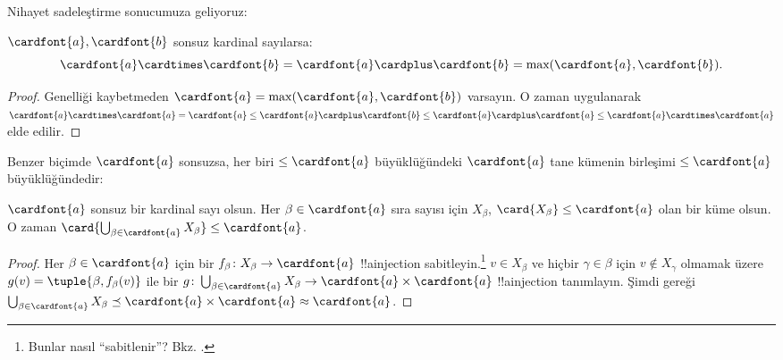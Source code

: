 Nihayet sadeleştirme sonucumuza geliyoruz:

\begin{thm}
$\cardfont{a},\cardfont{b}$ sonsuz kardinal sayılarsa:
\[
	\cardfont{a}
\cardtimes \cardfont{b} = \cardfont{a} \cardplus \cardfont{b} =
\text{max}(\cardfont{a}, \cardfont{b}).
\]
\end{thm}

\begin{proof}
Genelliği kaybetmeden $\cardfont{a}=\max(\cardfont{a},\cardfont{b})$
varsayın. O zaman  uygulanarak
$\cardfont{a}\cardtimes\cardfont{a}=\cardfont{a}\leq\cardfont{a}
\cardplus\cardfont{b}\leq\cardfont{a}\cardplus\cardfont{a}\leq
\cardfont{a}\cardtimes\cardfont{a}$ elde edilir.
\end{proof}\noindent
Benzer biçimde $\cardfont{a}$ sonsuzsa, her biri
$\leq\cardfont{a}$ büyüklüğündeki $\cardfont{a}$ tane kümenin birleşimi
$\leq\cardfont{a}$ büyüklüğündedir:

\begin{prop}
$\cardfont{a}$ sonsuz bir kardinal sayı olsun. Her
$\beta\in\cardfont{a}$ sıra sayısı için $X_\beta$,
$\card{X_\beta}\leq\cardfont{a}$ olan bir küme olsun. O zaman
$\card{\bigcup_{\beta \in \cardfont{a}} X_\beta}\leq\cardfont{a}$.
\end{prop}

\begin{proof}
Her $\beta\in\cardfont{a}$ için bir $f_\beta\colon
X_\beta\to\cardfont{a}$ !!a{injection} sabitleyin.\footnote{Bunlar nasıl
``sabitlenir''? Bkz. .}
$v\in X_\beta$ ve hiçbir $\gamma\in\beta$ için $v\notin X_\gamma$
olmamak üzere $g(v)=\tuple{\beta,f_\beta(v)}$ ile bir
$g\colon\bigcup_{\beta \in \cardfont{a}}X_\beta\to
\cardfont{a}\times\cardfont{a}$ !!a{injection} tanımlayın. Şimdi
 gereği
$\bigcup_{\beta \in \cardfont{a}} X_\beta \preceq
\cardfont{a}\times\cardfont{a}\approx\cardfont{a}$.
\end{proof}

